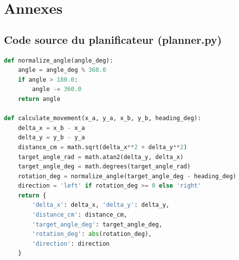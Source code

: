 \documentclass[a4paper,12pt,openany,titlepage]{scrartcl}
\begin{document}
\newpage

\section{Annexes}

\subsection{Code source du planificateur (planner.py)}
\begin{lstlisting}[language=Python, caption=planner.py -- Fonctions principales]
def normalize_angle(angle_deg):
    angle = angle_deg % 360.0
    if angle > 180.0:
        angle -= 360.0
    return angle

def calculate_movement(x_a, y_a, x_b, y_b, heading_deg):
    delta_x = x_b - x_a
    delta_y = y_b - y_a
    distance_cm = math.sqrt(delta_x**2 + delta_y**2)
    target_angle_rad = math.atan2(delta_y, delta_x)
    target_angle_deg = math.degrees(target_angle_rad)
    rotation_deg = normalize_angle(target_angle_deg - heading_deg)
    direction = 'left' if rotation_deg >= 0 else 'right'
    return {
        'delta_x': delta_x, 'delta_y': delta_y,
        'distance_cm': distance_cm,
        'target_angle_deg': target_angle_deg,
        'rotation_deg': abs(rotation_deg),
        'direction': direction
    }
\end{lstlisting}
\end{document}
